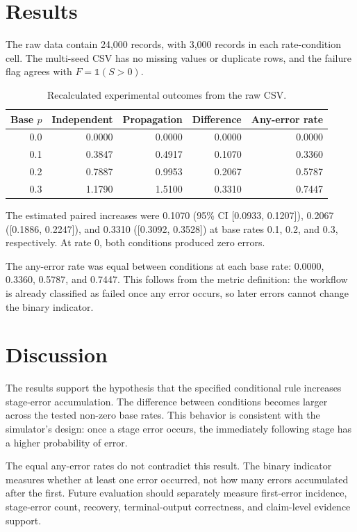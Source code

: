 \documentclass[sigconf,nonacm]{acmart}
\begin{document}
\section{Results}
The raw data contain 24,000 records, with 3,000 records in each rate-condition cell. The multi-seed CSV has no missing values or duplicate rows, and the failure flag agrees with $F=\mathbb{1}(S>0)$.

\begin{table}[t]
\caption{Recalculated experimental outcomes from the raw CSV.}
\centering\small
\begin{tabular}{rrrrr}
\toprule
Base $p$ & Independent & Propagation & Difference & Any-error rate\\
\midrule
0.0 & 0.0000 & 0.0000 & 0.0000 & 0.0000\\
0.1 & 0.3847 & 0.4917 & 0.1070 & 0.3360\\
0.2 & 0.7887 & 0.9953 & 0.2067 & 0.5787\\
0.3 & 1.1790 & 1.5100 & 0.3310 & 0.7447\\
\bottomrule
\end{tabular}
\end{table}

The estimated paired increases were 0.1070 (95\% CI [0.0933, 0.1207]), 0.2067 ([0.1886, 0.2247]), and 0.3310 ([0.3092, 0.3528]) at base rates 0.1, 0.2, and 0.3, respectively. At rate 0, both conditions produced zero errors.

The any-error rate was equal between conditions at each base rate: 0.0000, 0.3360, 0.5787, and 0.7447. This follows from the metric definition: the workflow is already classified as failed once any error occurs, so later errors cannot change the binary indicator.

\section{Discussion}
The results support the hypothesis that the specified conditional rule increases stage-error accumulation. The difference between conditions becomes larger across the tested non-zero base rates. This behavior is consistent with the simulator's design: once a stage error occurs, the immediately following stage has a higher probability of error.

The equal any-error rates do not contradict this result. The binary indicator measures whether at least one error occurred, not how many errors accumulated after the first. Future evaluation should separately measure first-error incidence, stage-error count, recovery, terminal-output correctness, and claim-level evidence support.
\end{document}
